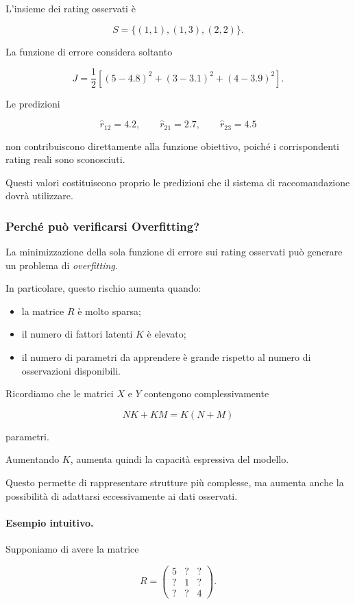 L'insieme dei rating osservati è

\[
S=\{(1,1),(1,3),(2,2)\}.
\]

La funzione di errore considera soltanto

\[
J=
\frac{1}{2}
\left[
(5-4.8)^2+
(3-3.1)^2+
(4-3.9)^2
\right].
\]

Le predizioni

\[
\widehat r_{12}=4.2,
\qquad
\widehat r_{21}=2.7,
\qquad
\widehat r_{23}=4.5
\]

non contribuiscono direttamente alla funzione obiettivo,
poiché i corrispondenti rating reali sono sconosciuti.

Questi valori costituiscono proprio le predizioni
che il sistema di raccomandazione dovrà utilizzare.

\subsubsection{Perché può verificarsi Overfitting?}

La minimizzazione della sola funzione di errore sui rating
osservati può generare un problema di \emph{overfitting}.

In particolare, questo rischio aumenta quando:

\begin{itemize}
    \item la matrice $R$ è molto sparsa;
    \item il numero di fattori latenti $K$ è elevato;
    \item il numero di parametri da apprendere è grande
    rispetto al numero di osservazioni disponibili.
\end{itemize}

Ricordiamo che le matrici $X$ e $Y$ contengono
complessivamente

\[
NK+KM=K(N+M)
\]

parametri.

Aumentando $K$, aumenta quindi la capacità espressiva
del modello.

Questo permette di rappresentare strutture più complesse,
ma aumenta anche la possibilità di adattarsi eccessivamente
ai dati osservati.

\paragraph{Esempio intuitivo.}

Supponiamo di avere la matrice

\[
R=
\begin{pmatrix}
5 & ? & ?\\
? & 1 & ?\\
? & ? & 4
\end{pmatrix}.
\]

